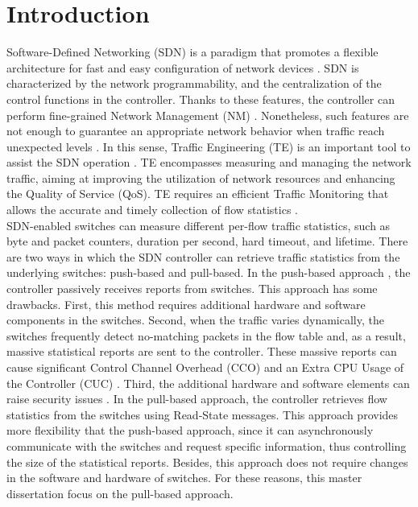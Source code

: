 \chapter{Introduction}
\label{sec:introduction}

Software-Defined Networking (SDN) is a paradigm that promotes a flexible architecture for fast and easy configuration of network devices \cite{machado_2014:towards_SLA_Policy}. SDN is characterized by the network programmability, and the centralization of the control functions in the controller. Thanks to these features, the controller can perform fine-grained Network Management (NM) \cite{lopez_201:sdn-ml-wlans}. Nonetheless, such features are not enough to guarantee an appropriate network behavior when traffic reach unexpected levels \cite{herrera_2016:nfv_survey,ESTRADASOLANO2017150}. In this sense, Traffic Engineering (TE) is an important tool to assist the SDN operation \cite{ian_2014:a_road_map_sdn}. TE encompasses measuring and managing the network traffic, aiming at improving the utilization of network resources and enhancing the Quality of Service (QoS). TE requires an efficient Traffic Monitoring that allows the accurate and timely collection of flow statistics \cite{rendon2014:monitoring}.\\

SDN-enabled switches can measure different per-flow traffic statistics, such as byte and packet counters, duration per second, hard timeout, and lifetime. There are two ways in which the SDN controller can retrieve traffic statistics from the underlying switches: push-based and pull-based. In the push-based approach \cite{Yu_2013:flow_sense, suh_2014:OpenSample}, the controller passively receives reports from switches. This approach has some drawbacks. First, this method requires additional hardware and software components in the switches. Second, when the traffic varies dynamically, the switches frequently detect no-matching packets in the flow table and, as a result, massive statistical reports are sent to the controller. These massive reports can cause significant Control Channel Overhead (CCO) \cite{aslan_2016:impact} and an Extra CPU Usage of the Controller (CUC) \cite{su_2014:flowcover}. Third, the additional hardware and software elements can raise security issues \cite{dharsee_2017:software}. In the pull-based approach, the controller retrieves flow statistics from the switches using Read-State messages. This approach provides more flexibility that the push-based approach, since it can asynchronously communicate with the switches and request specific information, thus controlling the size of the statistical reports. Besides, this approach does not require changes in the software and hardware of switches. For these reasons, this master dissertation focus on the pull-based approach. \\

